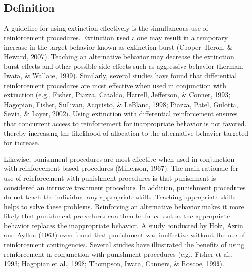 \section[\fourdNineteen{}]{\fourdNineteen{}%
              }
\subsection{Definition}
A guideline for using extinction effectively is the simultaneous use of reinforcement procedures. Extinction used alone may result in a temporary increase in the target behavior known as extinction burst (Cooper, Heron, \& Heward, 2007). Teaching an alternative behavior may decrease the extinction burst effects and other possible side effects such as aggressive behavior (Lerman, Iwata, \& Wallace, 1999). Similarly, several studies have found that differential reinforcement procedures are most effective when used in conjunction with extinction (e.g., Fisher, Piazza, Cataldo, Harrell, Jefferson, \& Conner, 1993; Hagopian, Fisher, Sullivan, Acquisto, \& LeBlanc, 1998; Piazza, Patel, Gulotta, Sevin, \& Layer, 2002).  Using extinction with differential reinforcement ensures that concurrent access to reinforcement for inappropriate behavior is not favored, thereby increasing the likelihood of allocation to the alternative behavior targeted for increase.

Likewise, punishment procedures are most effective when used in conjunction with reinforcement-based procedures (Millenson, 1967).  The main rationale for use of reinforcement with punishment procedures is that punishment is considered an intrusive treatment procedure. In addition, punishment procedures do not teach the individual any appropriate skills. Teaching appropriate skills helps to solve these problems. Reinforcing an alternative behavior makes it more likely that punishment procedures can then be faded out as the appropriate behavior replaces the inappropriate behavior. A study conducted by Holz, Azrin and Ayllon (1963) even found that punishment was ineffective without the use of reinforcement contingencies.  Several studies have illustrated the benefits of using reinforcement in conjunction with punishment procedures (e.g., Fisher et al., 1993; Hagopian et al., 1998; Thompson, Iwata, Conners, \& Roscoe, 1999).
%
